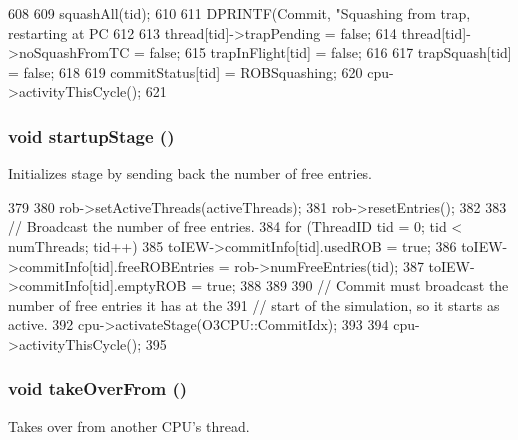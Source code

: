 \begin{DoxyCode}
608 {
609     squashAll(tid);
610 
611     DPRINTF(Commit, "Squashing from trap, restarting at PC %
612 
613     thread[tid]->trapPending = false;
614     thread[tid]->noSquashFromTC = false;
615     trapInFlight[tid] = false;
616 
617     trapSquash[tid] = false;
618 
619     commitStatus[tid] = ROBSquashing;
620     cpu->activityThisCycle();
621 }
\end{DoxyCode}
\hypertarget{classDefaultCommit_a31d4cbdab16d4ff8d6bc7f84ece727da}{
\subsubsection[{startupStage}]{\setlength{\rightskip}{0pt plus 5cm}void startupStage ()}}
\label{classDefaultCommit_a31d4cbdab16d4ff8d6bc7f84ece727da}
Initializes stage by sending back the number of free entries. 


\begin{DoxyCode}
379 {
380     rob->setActiveThreads(activeThreads);
381     rob->resetEntries();
382 
383     // Broadcast the number of free entries.
384     for (ThreadID tid = 0; tid < numThreads; tid++) {
385         toIEW->commitInfo[tid].usedROB = true;
386         toIEW->commitInfo[tid].freeROBEntries = rob->numFreeEntries(tid);
387         toIEW->commitInfo[tid].emptyROB = true;
388     }
389 
390     // Commit must broadcast the number of free entries it has at the
391     // start of the simulation, so it starts as active.
392     cpu->activateStage(O3CPU::CommitIdx);
393 
394     cpu->activityThisCycle();
395 }
\end{DoxyCode}
\hypertarget{classDefaultCommit_a8674059ce345e23aac5086b2c3e24a43}{
\subsubsection[{takeOverFrom}]{\setlength{\rightskip}{0pt plus 5cm}void takeOverFrom ()}}
\label{classDefaultCommit_a8674059ce345e23aac5086b2c3e24a43}
Takes over from another CPU's thread. 


